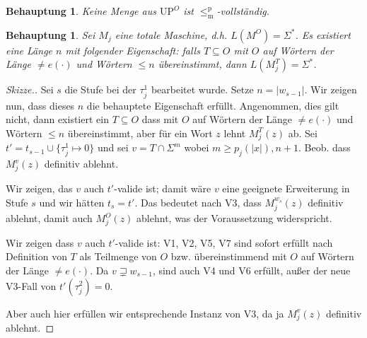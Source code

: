 \documentclass[nofonts]{uebung}
\newtheorem{claim}[theorem]{Behauptung}
\theoremstyle{definition}
\def\UP{\ensuremath{\mathrm{UP}}}
\def\leqmp{\ensuremath{\leq_\mathrm{m}^\mathrm{p}}}
\begin{document}
\begin{claim}
    Keine Menge aus $\UP^O$ ist $\leqmp$-vollständig.
\end{claim}


\begin{claim}
    Sei $M_j$ eine totale Maschine, d.h. $L(M^O)=\Sigma^*$.
    Es existiert eine Länge $n$ mit folgender Eigenschaft: 
    falls $T\subseteq O$ mit $O$ auf Wörtern der Länge $\neq e(\cdot)$ und Wörtern $\leq n$ übereinstimmt, dann $L(M_j^T)=\Sigma^*$.
\end{claim}
\begin{proof}[Skizze.]
    Sei $s$ die Stufe bei der $\tau^1_j$ bearbeitet wurde. Setze $n=|w_{s-1}|$.
    Wir zeigen nun, dass dieses $n$ die behauptete Eigenschaft erfüllt.
    Angenommen, dies gilt nicht, dann existiert ein $T\subseteq O$ dass mit $O$ auf Wörtern der Länge $\neq e(\cdot)$ und Wörtern $\leq n$ übereinstimmt, aber für ein Wort $z$ lehnt $M_j^T(z)$ ab.
    Sei $t'=t_{s-1}\cup \{\tau^1_j\mapsto 0\}$ und sei $v=T\cap\Sigma^{m}$ wobei $m\geq p_j(|x|), n+1$. 
    Beob. dass $M_j^v(z)$ definitiv ablehnt.

    Wir zeigen, das $v$ auch $t'$-valide ist;  damit wäre $v$ eine geeignete Erweiterung in Stufe $s$ und wir hätten $t_s=t'$. 
    Das bedeutet nach V3, dass $M_j^{w_s}(z)$ definitiv ablehnt, damit auch $M_j^O(z)$ ablehnt, was der Voraussetzung widerspricht.

    Wir zeigen dass $v$ auch $t'$-valide ist:
    V1, V2, V5, V7 sind sofort erfüllt nach Definition von $T$ als Teilmenge von $O$ bzw. übereinstimmend mit $O$ auf Wörtern der Länge $\neq e(\cdot)$.
    Da $v\sqsupsetneq w_{s-1}$, sind auch V4 und V6 erfüllt, außer der neue V3-Fall von $t'(\tau_j^2)=0$.

    Aber auch hier erfüllen wir entsprechende Instanz von V3, da ja $M_j^v(z)$ definitiv ablehnt.
\end{proof}
\end{document}
